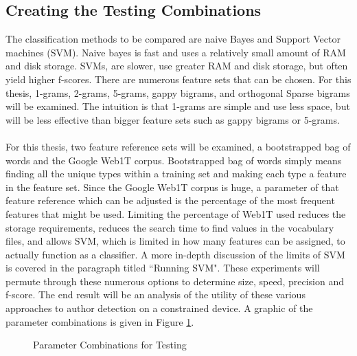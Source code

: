 	\subsection{Creating the Testing Combinations} The classification methods to be compared are naive Bayes and Support Vector machines (SVM). Naive bayes is fast and uses a relatively small amount of RAM and disk storage. SVMs, are slower, use greater RAM and disk storage, but often yield higher f-scores.  There are numerous feature sets that can be chosen.  For this thesis, 1-grams, 2-grams, 5-grams, gappy bigrams, and orthogonal Sparse bigrams will be examined.  The intuition is that 1-grams are simple and use less space, but will be less effective than bigger feature sets such as gappy bigrams or 5-grams.
	\paragraph{} For this thesis, two feature reference sets will be examined, a bootstrapped bag of words and the Google Web1T corpus.  Bootstrapped bag of words simply means finding all the unique types within a training set and making each type a feature in the feature set. Since the Google Web1T corpus is huge, a parameter of that feature reference which can be adjusted is the percentage of the most frequent features that might be used.  Limiting the percentage of Web1T used reduces the storage requirements, reduces the search time to find values in the vocabulary files, and allows SVM, which is limited in how many features can be assigned, to actually function as a classifier.  A more in-depth discussion of the limits of SVM is covered in the paragraph titled ``Running SVM". These experiments will permute through these numerous options to determine size, speed, precision and f-score.  The end result will be an analysis of the utility of these various approaches to author detection on a constrained device.  A graphic of the parameter combinations is given in Figure \ref{fig:parameterCombinations}.   
	
	\begin{figure}[ht!]
		\begin{center}
			\caption{Parameter Combinations for Testing}
			\label{fig:parameterCombinations}
		\end{center}
	\end{figure}
	
